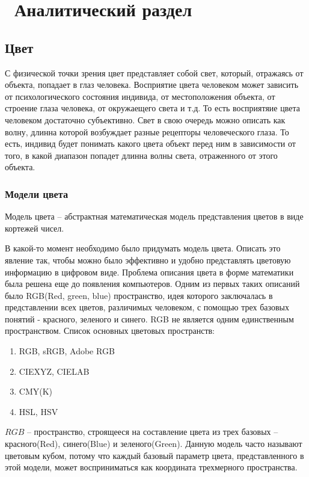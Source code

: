 \chapter{ Аналитический раздел}
\label{cha:analysis}

\section{ Цвет}
С физической точки зрения цвет представляет собой свет, который, отражаясь от объекта, попадает в глаз человека. Восприятие цвета человеком может зависить от психологического состояния индивида, от местоположения объекта, от строение глаза человека, от окружаещего света и т.д. То есть восприятяие цвета человеком достаточно субъективно. Свет в свою очередь можно описать как волну, длинна которой возбуждает разные рецепторы человеческого глаза. То есть, индивид будет понимать какого цвета объект перед ним в зависимости от того, в какой диапазон попадет длинна волны света, отраженного от этого объекта.

\subsection{ Модели цвета}

Модель цвета -- абстрактная математическая модель представления цветов в виде кортежей чисел.

В какой-то момент необходимо было придумать модель цвета. Описать это явление так, чтобы можно было эффективно и удобно представлять цветовую информацию в цифровом виде. Проблема описания цвета в форме математики была решена еще до появления компьютеров. Одним из первых таких описаний было RGB(Red, green, blue) пространство, идея которого заключалась в представлении всех цветов, различимых человеком, с помощью трех базовых понятий - красного, зеленого и синего. RGB не является одним единственным пространством. Список основных цветовых пространств:
\begin{enumerate}
	\item RGB, sRGB, Adobe RGB
	\item CIEXYZ, CIELAB
	\item CMY(K)
	\item HSL, HSV
\end{enumerate}

$RGB$ -- пространство, строящееся на составление цвета из трех базовых -- красного(Red), синего(Blue) и зеленого(Green). Данную модель часто называют цветовым кубом, потому что каждый базовый параметр цвета, представленного в этой модели, может восприниматься как координата трехмерного пространства.

